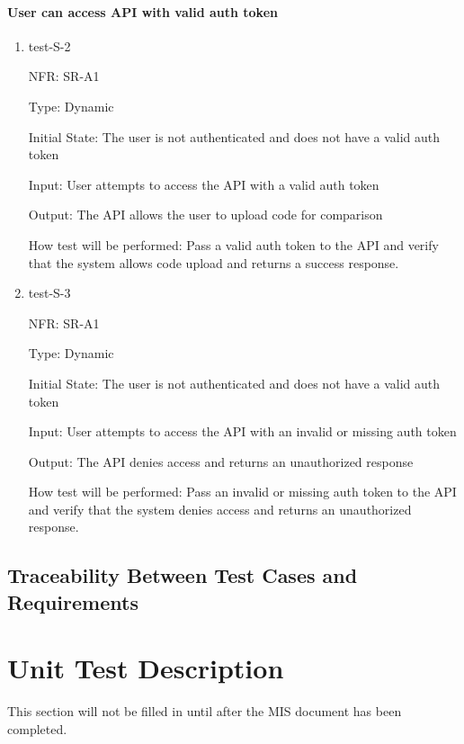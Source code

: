 \documentclass[12pt, titlepage]{article}
\begin{document}
\paragraph{User can access API with valid auth token}
\begin{enumerate}
  \item{test-S-2}

  NFR: SR-A1

  Type: Dynamic
            
  Initial State: The user is not authenticated and does not have a valid auth token
            
  Input: User attempts to access the API with a valid auth token
            
  Output: The API allows the user to upload code for comparison
            
  How test will be performed: 
  Pass a valid auth token to the API and verify that the system allows code upload and returns a success response.

  \item{test-S-3}

  NFR: SR-A1

  Type: Dynamic

  Initial State: The user is not authenticated and does not have a valid auth token

  Input: User attempts to access the API with an invalid or missing auth token

  Output: The API denies access and returns an unauthorized response

  How test will be performed:
  Pass an invalid or missing auth token to the API and verify that the system denies access and returns an unauthorized response.

\end{enumerate}

\subsection{Traceability Between Test Cases and Requirements}


\section{Unit Test Description}
This section will not be filled in until after the MIS document has been completed.
\end{document}
